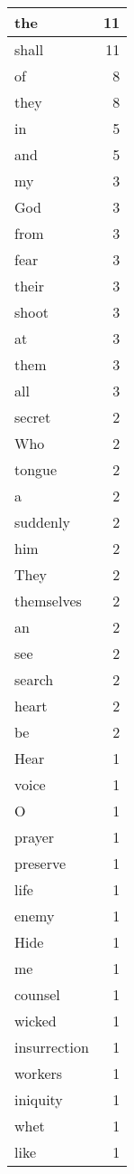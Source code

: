 \begin{center}
\begin{longtable}{l|r}
\hline \hline
\endlastfoot
the & 11 \\ \hline
shall & 11 \\ \hline
of & 8 \\ \hline
they & 8 \\ \hline
in & 5 \\ \hline
and & 5 \\ \hline
my & 3 \\ \hline
God & 3 \\ \hline
from & 3 \\ \hline
fear & 3 \\ \hline
their & 3 \\ \hline
shoot & 3 \\ \hline
at & 3 \\ \hline
them & 3 \\ \hline
all & 3 \\ \hline
secret & 2 \\ \hline
Who & 2 \\ \hline
tongue & 2 \\ \hline
a & 2 \\ \hline
suddenly & 2 \\ \hline
him & 2 \\ \hline
They & 2 \\ \hline
themselves & 2 \\ \hline
an & 2 \\ \hline
see & 2 \\ \hline
search & 2 \\ \hline
heart & 2 \\ \hline
be & 2 \\ \hline
Hear & 1 \\ \hline
voice & 1 \\ \hline
O & 1 \\ \hline
prayer & 1 \\ \hline
preserve & 1 \\ \hline
life & 1 \\ \hline
enemy & 1 \\ \hline
Hide & 1 \\ \hline
me & 1 \\ \hline
counsel & 1 \\ \hline
wicked & 1 \\ \hline
insurrection & 1 \\ \hline
workers & 1 \\ \hline
iniquity & 1 \\ \hline
whet & 1 \\ \hline
like & 1 \\ \hline

\end{longtable}
\end{center}
